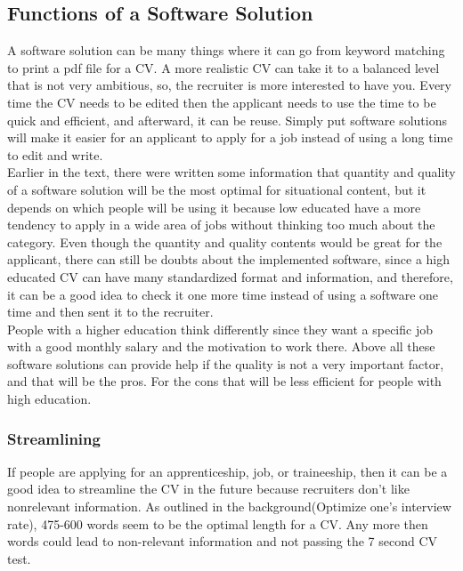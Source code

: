 \subsection{Functions of a Software Solution}
A software solution can be many things where it can go from keyword matching to print a pdf file for a CV.
A more realistic CV can take it to a balanced level that is not very ambitious, 
so, the recruiter is more interested to have you. Every time the CV needs to be edited
then the applicant needs to use the time to be quick and efficient, and afterward, it can be reuse.
Simply put software solutions will make it easier for an applicant to apply for a job instead of using a long time to edit and write. \\

Earlier in the text, there were written some information 
that quantity and quality of a software solution will be the most optimal for situational content,
but it depends on which people will be using it because low educated have a more tendency to apply
in a wide area of jobs without thinking too much about the category. 
Even though the quantity and quality contents would be great for the applicant, 
there can still be doubts about the implemented software, since a high educated CV can have many standardized format and information,
and therefore, it can be a good idea to check it one more time instead of using a software one time and then sent it to the recruiter. \\

People with a higher education think differently since they want a specific job
with a good monthly salary and the motivation to work there. 
Above all these software solutions can provide help if the quality is not a very important factor,
and that will be the pros. For the cons that will be less efficient for people with high education.

\subsubsection{Streamlining}
If people are applying for an apprenticeship, job, or traineeship, 
then it can be a good idea to streamline the CV in the future because recruiters don't like nonrelevant information.
As outlined in the background(Optimize one's interview rate), 475-600 words seem to be the optimal length for a CV.
Any more then words could lead to non-relevant information and not passing the 7 second CV test. \\

